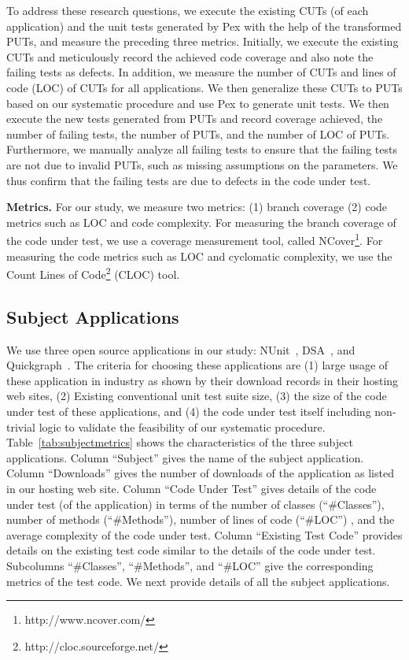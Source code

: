 To address these research questions, we execute the existing CUTs (of each application) and the unit tests generated by Pex with the help of the transformed PUTs, and measure the preceding three metrics. Initially, we execute the existing CUTs and meticulously record the achieved code coverage and also note the failing tests as defects. In addition, we measure the number of CUTs and lines of code (LOC) of CUTs for all applications. We then generalize these CUTs to PUTs based on our systematic procedure and use Pex to generate unit tests. We then execute the new tests generated from PUTs and record coverage achieved, the number of failing tests, the number of PUTs, and the number of LOC of PUTs. Furthermore, we manually analyze all failing tests to ensure that the failing tests are not due to invalid PUTs, such as missing assumptions on the parameters. We thus confirm that the failing tests are due to defects in the code under test. 

\noindent\textbf{Metrics.} For our study, we measure two metrics: (1) branch coverage (2) code metrics such as LOC and code complexity. For measuring the branch coverage of the code under test, we use a coverage measurement tool, called NCover\footnote{http://www.ncover.com/}. For measuring the code metrics such as LOC and cyclomatic complexity, we use the Count Lines of Code\footnote{http://cloc.sourceforge.net/} (CLOC) tool.

\subsection{Subject Applications}

We use three open source applications in our study: NUnit~\cite{nunit}, DSA~\cite{dsa}, and Quickgraph~\cite{quickgraph}. The criteria for choosing these applications are (1) large usage of these application in industry as shown by their download records in their hosting web sites, (2) Existing conventional unit test suite size, (3) the size of the code under test of these applications, and (4) the code under test itself including non-trivial logic to validate the feasibility of our systematic procedure. Table~\ref{tab:subjectmetrics} shows the characteristics of the three subject applications. Column ``Subject'' gives the name of the subject application. Column ``Downloads'' gives the number of downloads of the application as listed in our hosting web site. Column ``Code Under Test'' gives details of the code under test (of the application) in terms of the number of classes (``\#Classes''), number of methods (``\#Methods''), number of lines of code (``\#LOC'') , and the average complexity of the code under test. Column ``Existing Test Code'' provides details on the existing test code similar to the details of the code under test. Subcolumns ``\#Classes'', ``\#Methods'', and ``\#LOC'' give the corresponding metrics of the test code. We next provide details of all the subject applications.

